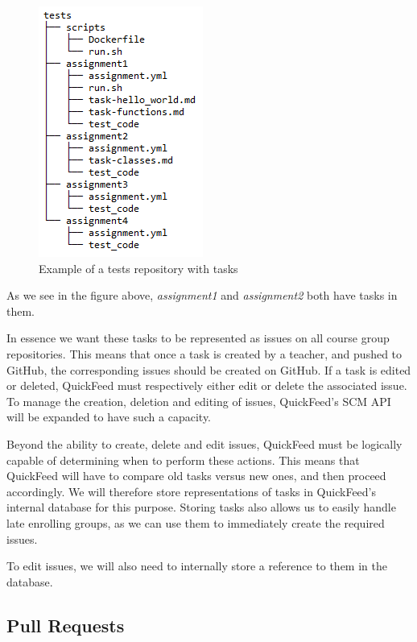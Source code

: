 \begin{figure}[ht]
    \centering
    \includegraphics[scale=0.8]{photos/tests-repository-structure-tasks.PNG}
    \caption{Example of a tests repository with tasks}
    \label{fig:tests-repository-structure-tasks}
\end{figure}

As we see in the figure above, \textit{assignment1} and \textit{assignment2} both have tasks in them.

In essence we want these tasks to be represented as issues on all course group repositories.
This means that once a task is created by a teacher, and pushed to GitHub, the corresponding issues should be created on GitHub.
If a task is edited or deleted, QuickFeed must respectively either edit or delete the associated issue.
To manage the creation, deletion and editing of issues, QuickFeed's SCM API will be expanded to have such a capacity.

Beyond the ability to create, delete and edit issues, QuickFeed must be logically capable of determining when to perform these actions.
This means that QuickFeed will have to compare old tasks versus new ones, and then proceed accordingly.
We will therefore store representations of tasks in QuickFeed's internal database for this purpose.
Storing tasks also allows us to easily handle late enrolling groups, as we can use them to immediately create the required issues.

To edit issues, we will also need to internally store a reference to them in the database.

\subsection{Pull Requests}

